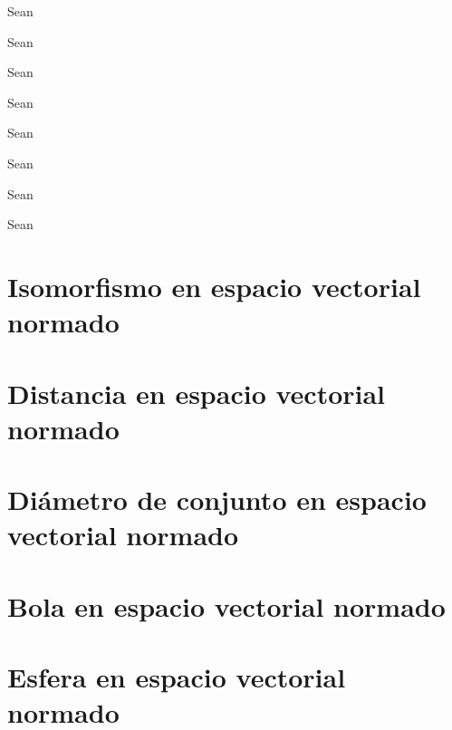 \begin{prob}
	\label{prob13}
	Sean
\end{prob}

\begin{prob}
	\label{prob14}
	Sean
\end{prob}

\begin{prob}
	\label{prob15}
	Sean
\end{prob}

\begin{prob}
	\label{prob16}
	Sean
\end{prob}

\begin{prob}
	\label{prob17}
	Sean
\end{prob}

\begin{prob}
	\label{prob18}
	Sean
\end{prob}

\begin{prob}
	\label{prob19}
	Sean
\end{prob}

\begin{prob}
	\label{prob20}
	Sean
\end{prob}



\section{Isomorfismo en espacio vectorial normado}

\section{Distancia en espacio vectorial normado}

\section{Diámetro de conjunto en espacio vectorial normado}

\section{Bola en espacio vectorial normado}

\section{Esfera en espacio vectorial normado}

